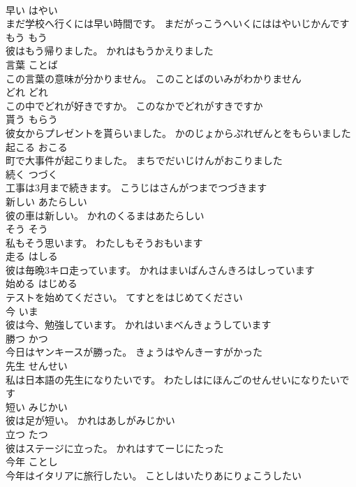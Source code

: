 \documentclass[8pt]{extreport}
\begin{document}
\begin{CJK}{UTF8}{min}
\\	早い	はやい	
\\	まだ学校へ行くには早い時間です。	まだがっこうへいくにははやいじかんです	
\\	もう	もう	
\\	彼はもう帰りました。	かれはもうかえりました	
\\	言葉	ことば	
\\	この言葉の意味が分かりません。	このことばのいみがわかりません	
\\	どれ	どれ	
\\	この中でどれが好きですか。	このなかでどれがすきですか	
\\	貰う	もらう	
\\	彼女からプレゼントを貰らいました。	かのじょからぷれぜんとをもらいました	
\\	起こる	おこる	
\\	町で大事件が起こりました。	まちでだいじけんがおこりました	
\\	続く	つづく	
\\	工事は3月まで続きます。	こうじはさんがつまでつづきます	
\\	新しい	あたらしい	
\\	彼の車は新しい。	かれのくるまはあたらしい	
\\	そう	そう	
\\	私もそう思います。	わたしもそうおもいます	
\\	走る	はしる	
\\	彼は毎晩3キロ走っています。	かれはまいばんさんきろはしっています	
\\	始める	はじめる	
\\	テストを始めてください。	てすとをはじめてください	
\\	今	いま	
\\	彼は今、勉強しています。	かれはいまべんきょうしています	
\\	勝つ	かつ	
\\	今日はヤンキースが勝った。	きょうはやんきーすがかった	
\\	先生	せんせい	
\\	私は日本語の先生になりたいです。	わたしはにほんごのせんせいになりたいです	
\\	短い	みじかい	
\\	彼は足が短い。	かれはあしがみじかい	
\\	立つ	たつ	
\\	彼はステージに立った。	かれはすてーじにたった	
\\	今年	ことし	
\\	今年はイタリアに旅行したい。	ことしはいたりあにりょこうしたい	

\end{CJK}
\end{document}
